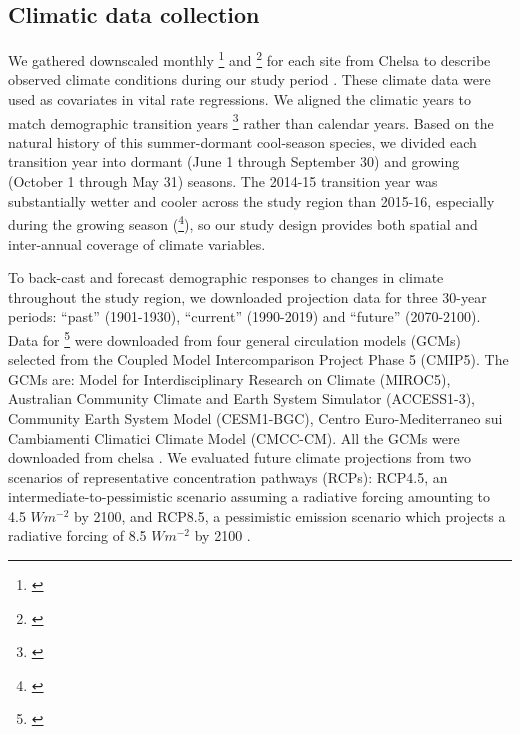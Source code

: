 \documentclass[12pt]{article}\usepackage[]{graphicx}\usepackage[dvipsnames]{xcolor}
\newcommand{\tom}[2]{{\color{red}{#1}}\footnote{\textit{\color{red}{#2}}}}
\begin{document}
\subsection*{Climatic data collection}
We gathered downscaled monthly \tom{temperature}{Give units} and \tom{precipitation}{Give units} for each site from Chelsa to describe observed climate conditions during our study period \citep{karger2017climatologies}.
These climate data were used as covariates in vital rate regressions. 
We aligned the climatic years to match demographic transition years \tom{{\color{blue}(May 1 -- April 30)}}{I think this is not right. I think we updated the transition year to be June 1 -- May 31.} rather than calendar years.
Based on the natural history of this summer-dormant cool-season species, we divided each transition year into dormant (June 1 through September 30) and growing (October 1 through May 31) seasons. 
The 2014-15 transition year was substantially wetter and cooler across the study region than 2015-16, especially during the growing season (\tom{figure}{I would like to use the figure I made called site-year-weather. However, I cannot tell from this figure whether the first year was unusually wet or the second year was unusually dry -- this will take looking at the climate data more broadly. I am also not sure if this figure was made before or after we changed the dates of the transition year, so it may need to be updated}), so our study design provides both spatial and inter-annual coverage of climate variables. 

To back-cast and forecast demographic responses to changes in climate throughout the study region, we downloaded projection data for three 30-year periods: ``past'' (1901-1930), ``current'' (1990-2019) and ``future'' (2070-2100).
Data for \tom{these climatic periods}{The four GCMs only refers to the future data, right?} were downloaded from four general circulation models (GCMs) selected from the Coupled Model Intercomparison Project Phase 5 (CMIP5). 
The GCMs are: Model for Interdisciplinary Research on Climate (MIROC5), Australian Community Climate and Earth System Simulator (ACCESS1-3), Community Earth System Model (CESM1-BGC), Centro Euro-Mediterraneo sui Cambiamenti Climatici Climate Model (CMCC-CM).
All the GCMs were downloaded from chelsa \citep{sanderson2015representative}.
We evaluated future climate projections from two scenarios of representative concentration pathways (RCPs): RCP4.5, an intermediate-to-pessimistic scenario assuming a radiative forcing amounting to 4.5 $W m^{-2}$ by 2100, and RCP8.5, a pessimistic emission scenario which projects a radiative forcing of 8.5 $W m^{-2}$ by 2100 \citep{thomson2011rcp4, schwalm2020rcp8}. 
\end{document}
